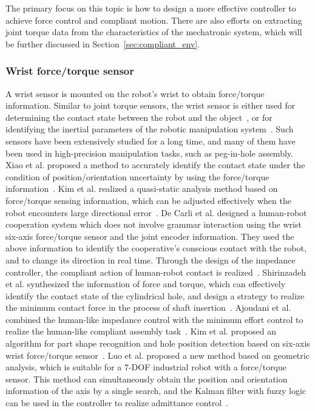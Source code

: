 \documentclass[journal,twoside,web]{ieeecolor}
\begin{document}
The primary focus on this topic is how to design a more effective controller to achieve force control and compliant motion. There are also efforts on extracting joint torque data from the characteristics of the mechatronic system, which will be further discussed in Section~\ref{sec:compliant_env}.

\subsubsection{Wrist force/torque sensor}

A wrist sensor is mounted on the robot's wrist to obtain force/torque information. 
Similar to joint torque sensors, the wrist sensor is either used for determining the contact state between the robot and the object~\cite{Garcia2009,Garciaa,Choi2015}, or for identifying the inertial parameters of the robotic manipulation system~\cite{Villani2000,Du2018a}.
Such sensors have been extensively studied for a long time, and many of them have been used in high-precision manipulation tasks, such as peg-in-hole assembly.
Xiao et al. proposed a method to accurately identify the contact state under the condition of position/orientation uncertainty by using the force/torque information~\cite{Xiao1998}. 
Kim et al. realized a quasi-static analysis method based on force/torque sensing information, which can be adjusted effectively when the robot encounters large directional error~\cite{Kim1999}. 
De Carli et al. designed a human-robot cooperation system which does not involve grammar interaction using the wrist six-axis force/torque sensor and the joint encoder information. 
They used the above information to identify the cooperative's conscious contact with the robot, and to change its direction in real time. 
Through the design of the impedance controller, the compliant action of human-robot contact is realized~\cite{De2009}. 
Shirinzadeh et al. synthesized the information of force and torque, which can effectively identify the contact state of the cylindrical hole, and design a strategy to realize the minimum contact force in the process of shaft insertion~\cite{Shirinzadeh11Hybrid}. 
Ajoudani et al. combined the human-like impedance control with the minimum effort control to realize the human-like compliant assembly task~\cite{Ajoudani2013}. 
Kim et al. proposed an algorithm for part shape recognition and hole position detection based on six-axis wrist force/torque sensor~\cite{Kim14}. 
Luo et al. proposed a new method based on geometric analysis, which is suitable for a 7-DOF industrial robot with a force/torque sensor. 
This method can simultaneously obtain the position and orientation information of the axis by a single search, and the Kalman filter with fuzzy logic can be used in the controller to realize admittance control~\cite{Luo2017}.
\end{document}
